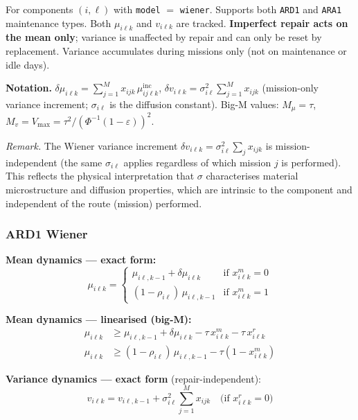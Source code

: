 \documentclass[11pt,a4paper]{article}
\begin{document}
For components $(i,\ell)$ with \texttt{model} $=$ \texttt{wiener}.
Supports both \texttt{ARD1} and \texttt{ARA1} maintenance types.
Both $\mu_{i\ell k}$ and $v_{i\ell k}$ are tracked.
\textbf{Imperfect repair acts on the mean only}; variance is unaffected by repair
and can only be reset by replacement.
Variance accumulates during missions only (not on maintenance or idle days).

\textbf{Notation.}
$\delta\mu_{i\ell k} = \sum_{j=1}^{M} x_{ijk}\,\mu^{\mathrm{inc}}_{ij\ell k}$,
$\delta v_{i\ell k} = \sigma^2_{i\ell}\sum_{j=1}^{M} x_{ijk}$
(mission-only variance increment; $\sigma_{i\ell}$ is the diffusion constant).
Big-M values: $M_\mu = \tau$, $M_v = V_{\max} = \tau^2/(\Phi^{-1}(1-\varepsilon))^2$.

\emph{Remark.} The Wiener variance increment $\delta v_{i\ell k} = \sigma^2_{i\ell}\sum_j x_{ijk}$
is mission-independent (the same $\sigma_{i\ell}$ applies regardless of which mission
$j$ is performed). This reflects the physical interpretation that $\sigma$ characterises
material microstructure and diffusion properties, which are intrinsic to the component
and independent of the route (mission) performed.

\subsubsection{ARD1 Wiener}

\textbf{Mean dynamics --- exact form:}
\begin{equation}
  \mu_{i\ell k} = \begin{cases}
    \mu_{i\ell,k-1} + \delta\mu_{i\ell k} & \text{if } x^m_{i\ell k} = 0 \\
    (1-\rho_{i\ell})\,\mu_{i\ell,k-1} & \text{if } x^m_{i\ell k} = 1
  \end{cases}
\end{equation}

\textbf{Mean dynamics --- linearised (big-M):}
\begin{align}
  \mu_{i\ell k} &\geq \mu_{i\ell,k-1} + \delta\mu_{i\ell k} - \tau\,x^m_{i\ell k}
    - \tau\,x^r_{i\ell k} \\
  \mu_{i\ell k} &\geq (1-\rho_{i\ell})\,\mu_{i\ell,k-1} - \tau(1-x^m_{i\ell k})
\end{align}

\textbf{Variance dynamics --- exact form} (repair-independent):
\begin{equation}
  v_{i\ell k} = v_{i\ell,k-1} + \sigma^2_{i\ell}\sum_{j=1}^{M} x_{ijk}
  \quad \text{(if } x^r_{i\ell k} = 0\text{)}
\end{equation}
\end{document}
